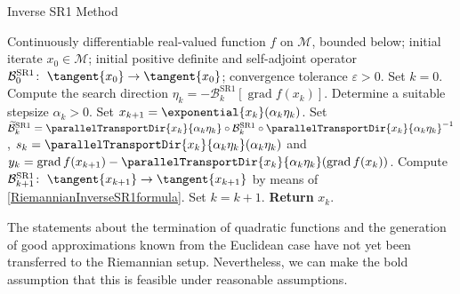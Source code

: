 \begin{algorithm}[H]
    \caption{Inverse SR1 Method}\label{RiemannianSR1Method}
    \begin{algorithmic}[1]
        \State Continuously differentiable real-valued function $f$ on $\mathcal{M}$, bounded below; initial iterate $x_0 \in \mathcal{M}$; initial positive definite and self-adjoint operator $\mathcal{B}^{\mathrm{SR1}}_0 \colon \; \tangent{x_0} \to \tangent{x_0}$; convergence tolerance $\varepsilon > 0$. Set $k = 0$.
            \State Compute the search direction $\eta_k = - \mathcal{B}^{\mathrm{SR1}}_k [\operatorname{grad} f(x_k)]$.
            \State  Determine a suitable stepsize $\alpha_k > 0$. 
            \State Set $x_{k+1} = \exponential{x_k} (\alpha_k \eta_k)$.
            \State Set $\widetilde{\mathcal{B}}^{\mathrm{SR1}}_k = \parallelTransportDir{x_k}{\alpha_k \eta_k} \circ \mathcal{B}^{\mathrm{SR1}}_k \circ {\parallelTransportDir{x_k}{\alpha_k \eta_k}}^{-1}$, $s_k = \parallelTransportDir{x_k}{\alpha_k \eta_k} (\alpha_k \eta_k)$ and 
            \StatexIndent[2] $y_k = \operatorname{grad} f(x_{k+1}) - \parallelTransportDir{x_k}{\alpha_k \eta_k} (\operatorname{grad} f(x_k))$.
            \State Compute $\mathcal{B}^{\mathrm{SR1}}_{k+1} \colon \; \tangent{x_{k+1}} \to \tangent{x_{k+1}}$ by means of \cref{RiemannianInverseSR1formula}. 
            \State Set $k = k+1$.
        \EndWhile
        \State \textbf{Return} $x_k$.
    \end{algorithmic}
\end{algorithm}
The statements about the termination of quadratic functions and the generation of good approximations known from the Euclidean case have not yet been transferred to the Riemannian setup. Nevertheless, we can make the bold assumption that this is feasible under reasonable assumptions.  